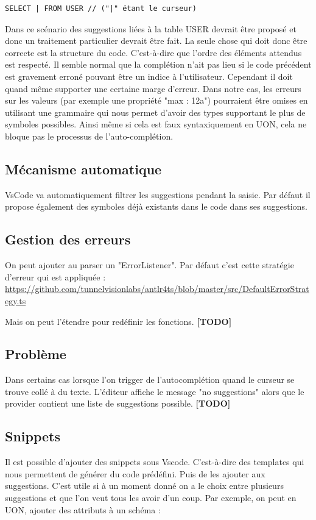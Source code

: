 \documentclass[
    iict, %
    il, %
]{heig-tb}
\begin{document}
\begin{lstlisting}
SELECT | FROM USER // ("|" étant le curseur)
\end{lstlisting}

Dans ce scénario des suggestions liées à la table USER devrait être proposé et donc un traitement particulier devrait être fait.
La seule chose qui doit donc être correcte est la structure du code. C'est-à-dire que l'ordre des éléments attendus est respecté.
Il semble normal que la complétion n'ait pas lieu si le code précédent est gravement erroné pouvant être un indice à l'utilisateur. Cependant il doit quand même supporter une certaine marge d'erreur. Dans notre cas, les erreurs sur les valeurs (par exemple une propriété "max : 12a") pourraient être omises en utilisant une grammaire qui nous permet d'avoir des types supportant le plus de symboles possibles. Ainsi même si cela est faux syntaxiquement en UON, cela ne bloque pas le processus de l'auto-complétion.

\subsection{Mécanisme automatique}
VsCode va automatiquement filtrer les suggestions pendant la saisie.
Par défaut il propose également des symboles déjà existants dans le code dans ses suggestions.

\subsection{Gestion des erreurs}
On peut ajouter au parser un "ErrorListener".
Par défaut c'est cette stratégie d'erreur qui est appliquée :
\href{https://github.com/tunnelvisionlabs/antlr4ts/blob/master/src/DefaultErrorStrategy.ts}{https://github.com/tunnelvisionlabs/antlr4ts/blob/master/src/DefaultErrorStrategy.ts}

Mais on peut l'étendre pour redéfinir les fonctions.
\textbf{[TODO]}

\subsection{Problème}
Dans certains cas lorsque l'on trigger de l'autocomplétion quand le curseur se trouve collé à du texte. L'éditeur affiche le message "no suggestions" alors que le provider contient une liste de suggestions possible.
\textbf{[TODO]}

\subsection{Snippets}
Il est possible d'ajouter des snippets sous Vscode. C'est-à-dire des templates qui nous permettent de générer du code prédéfini. Puis de les ajouter aux suggestions.
C'est utile si à un moment donné on a le choix entre plusieurs suggestions et que l'on veut tous les avoir d'un coup.
Par exemple, on peut en UON, ajouter des attributs à un schéma :
\end{document}

